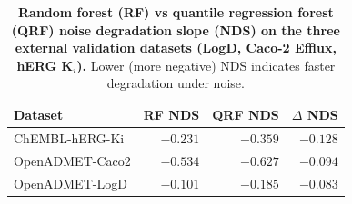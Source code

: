
\begin{table}[H]
\centering
\caption{\textbf{Random forest (RF) vs quantile regression forest (QRF) noise degradation slope (NDS) on the three external validation datasets (LogD, Caco-2 Efflux, hERG K$_i$).}
Lower (more negative) NDS indicates faster degradation under noise.}
\label{app:noise:rf_vs_qrf_assay}
\small
\begin{tabular}{lrrr}
\toprule
\textbf{Dataset} & \textbf{RF NDS} & \textbf{QRF NDS} & \textbf{$\Delta$ NDS} \\
\midrule
ChEMBL-hERG-Ki     & $-0.231$ & $-0.359$ & $-0.128$ \\
OpenADMET-Caco2    & $-0.534$ & $-0.627$ & $-0.094$ \\
OpenADMET-LogD     & $-0.101$ & $-0.185$ & $-0.083$ \\
\bottomrule
\end{tabular}
\end{table}
